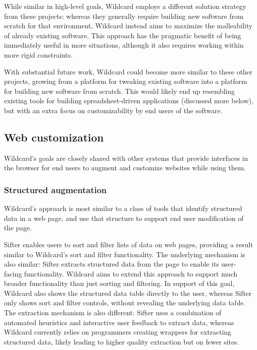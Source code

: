 \documentclass[english,submission]{programming}
\begin{document}
While similar in high-level goals, Wildcard employs a different solution
strategy from these projects: whereas they generally require building
new software from scratch for that environment, Wildcard instead aims to
maximize the malleability of already existing software. This approach
has the pragmatic benefit of being immediately useful in more
situations, although it also requires working within more rigid
constraints.

With substantial future work, Wildcard could become more similar to
these other projects, growing from a platform for tweaking existing
software into a platform for building new software from scratch. This
would likely end up resembling existing tools for building
spreadsheet-driven applications (discussed more below), but with an
extra focus on customizability by end users of the software.

\hypertarget{web-customization}{%
\subsection{Web customization}\label{web-customization}}

Wildcard's goals are closely shared with other systems that provide
interfaces in the browser for end users to augment and customize
websites while using them.

\hypertarget{structured-augmentation}{%
\subsubsection{Structured augmentation}\label{structured-augmentation}}

Wildcard's approach is most similar to a class of tools that identify
structured data in a web page, and use that structure to support end
user modification of the page.

Sifter \autocite{huynh2006} enables users to sort and filter lists of
data on web pages, providing a result similar to Wildcard's sort and
filter functionality. The underlying mechanism is also similar: Sifter
extracts structured data from the page to enable its user-facing
functionality. Wildcard aims to extend this approach to support much
broader functionality than just sorting and filtering. In support of
this goal, Wildcard also shows the structured data table directly to the
user, whereas Sifter only shows sort and filter controls, without
revealing the underlying data table. The extraction mechanism is also
different: Sifter uses a combination of automated heuristics and
interactive user feedback to extract data, whereas Wildcard currently
relies on programmers creating wrappers for extracting structured data,
likely leading to higher quality extraction but on fewer sites.
\end{document}
